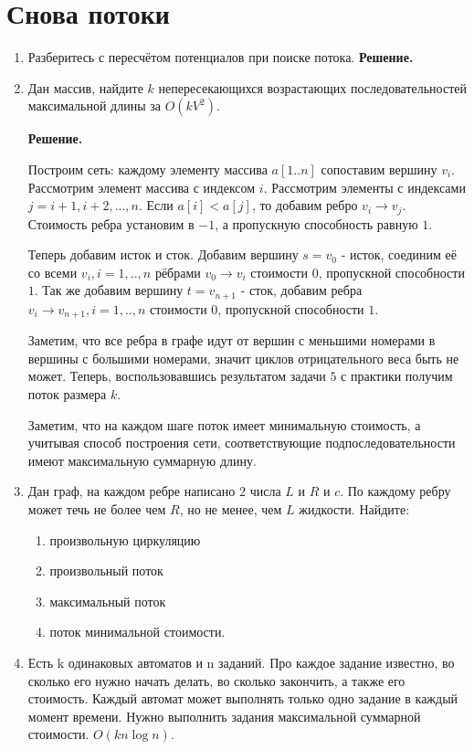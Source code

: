 \section*{Снова потоки}
\begin{enumerate}
	\item Разберитесь с пересчётом потенциалов при поиске потока.
	\textbf{Решение.}
	
	\item Дан массив, найдите $k$ непересекающихся возрастающих последовательностей максимальной длины за $O(kV^2)$.
	
	\textbf{Решение.}
	
	Построим сеть: каждому элементу массива $a[1..n]$ сопоставим вершину $v_i$. Рассмотрим элемент массива с 
	индексом $i$. Рассмотрим элементы с индексами $j = i + 1, i + 2, ..., n$. Если $a[i] < a[j]$, то добавим ребро 
	$v_i \to v_j$. Стоимость ребра установим в $-1$, а пропускную способность равную $1$. 
	
	Теперь добавим исток и сток. Добавим вершину $s = v_0$ - исток, соединим её со всеми $v_i, i = 1,..,n$ рёбрами 
	$v_0 \to v_i$ стоимости 0, пропускной способности $1$. Так же добавим вершину $t = v_{n + 1}$ - сток, добавим 
	ребра $v_i \to v_{n + 1}, i = 1,..,n$ стоимости $0$, пропускной способности $1$. 
	
	Заметим, что все ребра в графе идут от вершин с меньшими номерами в вершины с большими номерами, значит циклов 
	отрицательного веса быть не может. Теперь, воспользовавшись результатом задачи $5$ с практики получим поток 
	размера $k$. 
	
	Заметим, что на каждом шаге поток имеет минимальную стоимость, а учитывая способ построения сети, 
	соответствующие подпоследовательности имеют максимальную суммарную длину.
	
	\item Дан граф, на каждом ребре написано $2$ числа $L$ и $R$ и $c$. По каждому ребру может течь не более
	чем $R$, но не менее, чем $L$ жидкости. Найдите:
	\begin{enumerate}
		\item произвольную циркуляцию
		\item произвольный поток
		\item максимальный поток
		\item поток минимальной стоимости.
	\end{enumerate}
	
	\item Есть k одинаковых автоматов и n заданий. Про каждое задание известно, во сколько его нужно начать делать, 
	во сколько закончить, а также его стоимость. Каждый автомат может выполнять только одно задание в каждый момент 
	времени. Нужно выполнить задания максимальной суммарной стоимости. $O(kn \log n)$.
	

\end{enumerate}
